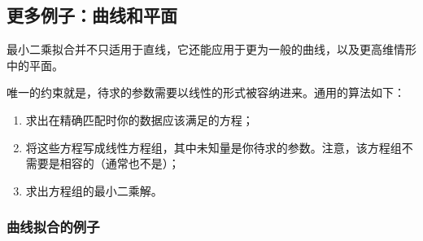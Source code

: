 \subsection{更多例子：曲线和平面}

最小二乘拟合并不只适用于直线，它还能应用于更为一般的曲线，以及更高维情形中的平面。

唯一的约束就是，待求的参数需要以线性的形式被容纳进来。通用的算法如下：
\begin{enumerate}
    \item 求出在精确匹配时你的数据应该满足的方程；
    \item 将这些方程写成线性方程组，其中未知量是你待求的参数。注意，该方程组不需要是相容的（通常也不是）；
    \item 求出方程组的最小二乘解。
\end{enumerate}

\subsubsection{曲线拟合的例子}

